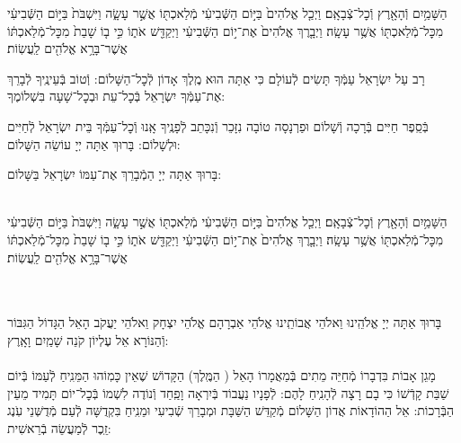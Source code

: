 \documentclass[twoside, openany, parskip=half, 11pt]{book}
\begin{document}
 הַשָּׁמַ֥יִם וְֿהָאָ֖רֶץ וְֿכׇל־צְֿבָאָֽם׃ וַיְכַ֤ל אֱלֹהִים֙ בַּיּ֣וֹם הַשְּֿׁבִיעִ֔י מְֿלַאכְתּ֖וֹ אֲשֶׁ֣ר עָשָׂ֑ה וַיִּשְׁבֹּת֙ בַּיּ֣וֹם הַשְּֿׁבִיעִ֔י מִכׇּל־מְֿלַאכְתּ֖וֹ אֲשֶׁ֥ר עָשָֽׂה׃ וַיְבָ֤רֶךְ אֱלֹהִים֙ אֶת־י֣וֹם הַשְּֿׁבִיעִ֔י וַיְקַדֵּ֖שׁ אֹת֑וֹ כִּ֣י ב֤וֹ שָׁבַת֙ מִכׇּל־מְֿלַאכְתּ֔וֹ אֲשֶׁר־בָּרָ֥א אֱלֹהִ֖ים לַֽעֲשֽׂוֹת׃  

\shabboskiddushhayom{}

\sepline

\label{maarivyt}
\ytkiddushhayom{\YTShabboshavdalah}


\sepline

\retzeh

\yaalehveyavo

\zion

\maarivmodim

\shabboschanukah

\shabboshodos

 רָב עַל יִשְׂרָאֵל עַמְּֿךָ תָּשִׂים לְֿעוֹלָם כִּי אַתָּה הוּא מֶֽלֶךְ אָדוֹן לְֿכׇל־הַשָּׁלוֹם: וְֿטוֹב בְּֿעֵינֶֽיךָ לְֿבָרֵךְ אֶת־עַמְּֿךָ יִשְׂרָאֵל בְּֿכׇל־עֵת וּבְכׇל־שָׁעָה בִּשְׁלוֹמֶךָ:
\vspace{-0.4\baselineskip}
\begin{paracol}{2}

\begin{small}
 בְּֿסֵֽפֶר חַיִּים בְּֿרָכָה וְֿשָׁלוֹם וּפַרְנָסָה טוֹבָה נִזָּכֵר וְֿנִכָּתֵב לְֿפָנֶֽיךָ אָֽנוּ וְֿכׇל־עַמְּֿךָ בֵּית יִשְׂרָאֵל לְֿחַיִּים וּלְשָׁלוֹם: בָּרוּךְ אַתָּה יְיָ עוֹשֵׂה הַשָּׁלוֹם:
\end{small}


\switchcolumn

בָּרוּךְ אַתָּה יְיָ הַמְֿבָרֵךְ אֶת־עַמּוֹ יִשְׂרָאֵל בַּשָּׁלוֹם:

\end{paracol}

\tachanunim


\label{vayachulu}
\\
 הַשָּׁמַ֥יִם וְֿהָאָ֖רֶץ וְֿכׇל־צְֿבָאָֽם׃ וַיְכַ֤ל אֱלֹהִים֙ בַּיּ֣וֹם הַשְּֿׁבִיעִ֔י מְֿלַאכְתּ֖וֹ אֲשֶׁ֣ר עָשָׂ֑ה וַיִּשְׁבֹּת֙ בַּיּ֣וֹם הַשְּֿׁבִיעִ֔י מִכׇּל־מְֿלַאכְתּ֖וֹ אֲשֶׁ֥ר עָשָֽׂה׃ וַיְבָ֤רֶךְ אֱלֹהִים֙ אֶת־י֣וֹם הַשְּֿׁבִיעִ֔י וַיְקַדֵּ֖שׁ אֹת֑וֹ כִּ֣י ב֤וֹ שָׁבַת֙ מִכׇּל־מְֿלַאכְתּ֔וֹ אֲשֶׁר־בָּרָ֥א אֱלֹהִ֖ים לַֽעֲשֽׂוֹת׃


\\
\\
בָּרוּךְ אַתָּה יְיָ אֱלֹהֵֽינוּ וֵאלֹהֵי אֲבוֹתֵֽינוּ אֱלֹהֵי אַבְרָהָם אֱלֹהֵי יִצְחָק וֵאלֹהֵי יַעֲקֹב הָאֵל הַגָּדוֹל הַגִּבּוֹר וְֿהַנּוֹרָא אֵל עֶלְיוֹן קֹנֵה שָׁמַֽיִם וָאָֽרֶץ:\\
\\
 מָגֵן אָבוֹת בִּדְבָרוֹ מְֿחַיֵּה מֵתִים בְּֿמַאֲמָרוֹ הָאֵל
 ( הַמֶּֽלֶךְ)
 הַקָּדוֹשׁ שֶׁאֵין כָּמֽוֹהוּ הַמֵּנִֽיחַ לְֿעַמּוֹ בְּֿיוֹם שַׁבַּת קָדְֿשׁוֹ כִּי בָם רָצָה לְֿהָנִֽיחַ לָהֶם: לְֿפָנָיו נַעֲבוֹד בְּֿיִרְאָה וָפַֽחַד וְֿנוֹדֶה לִשְׁמוֹ בְּֿכׇל־יוֹם תָּמִיד מֵעֵין הַבְּֿרָכוֹת: אֵל הַהוֹדָאוֹת אֲדוֹן הַשָּׁלוֹם מְֿקַדֵּשׁ הַשַּׁבָּת וּמְבָרֵךְ שְֿׁבִיעִי וּמֵנִֽיחַ בִּקְדֻשָּׁה לְֿעַם מְֿדֻשְּׁנֵי עֹֽנֶג זֵֽכֶר לְֿמַעֲשֵׂה בְֿרֵאשִׁית:
\end{document}
